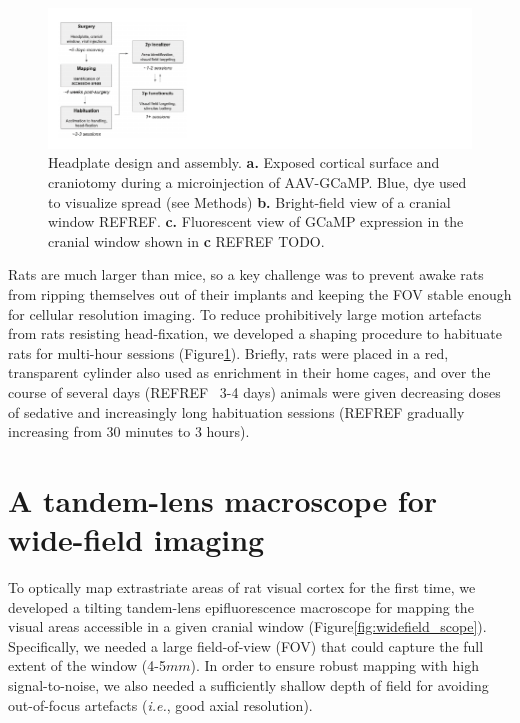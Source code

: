 \begin{figure}
    \includegraphics[width=\textwidth]{figures/chapter_2/experimental_pipeline.pdf}
    \vspace{.1in}
    \caption[Experimental pipeline]{Headplate design and assembly. \textbf{a.} Exposed cortical surface and craniotomy during a microinjection of AAV-GCaMP. Blue, dye used to visualize spread (see Methods) \textbf{b.} Bright-field view of a cranial window REFREF. \textbf{c.} Fluorescent view of GCaMP expression in the cranial window shown in \textbf{c} REFREF TODO.
    \label{fig:experimental_pipeline}}
\end{figure}

Rats are much larger than mice, so a key challenge was to prevent awake rats from ripping themselves out of their implants and keeping the FOV stable enough for cellular resolution imaging. To reduce prohibitively large motion artefacts from rats resisting head-fixation, we developed a shaping procedure to habituate rats for multi-hour sessions (Figure\ref{fig:experimental_pipeline}). Briefly, rats were placed in a red, transparent cylinder also used as enrichment in their home cages, and over the course of several days (REFREF ~3-4 days) animals were given decreasing doses of sedative and increasingly long habituation sessions (REFREF  gradually increasing from 30 minutes to 3 hours). 


\section{A tandem-lens macroscope for wide-field imaging}
To optically map extrastriate areas of rat visual cortex for the first time, we developed a tilting tandem-lens epifluorescence macroscope\cite{Ratzlaff1991} for mapping the visual areas accessible in a given cranial window (Figure\ref{fig:widefield_scope}). Specifically, we needed a large field-of-view (FOV) that could capture the full extent of the window (4-5$mm$). In order to ensure robust mapping with high signal-to-noise, we also needed a sufficiently shallow depth of field for avoiding out-of-focus artefacts (\textit{i.e.}, good axial resolution).

